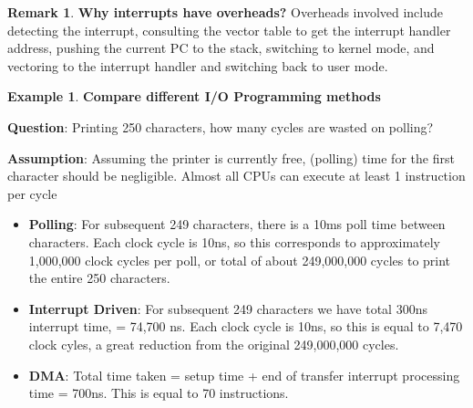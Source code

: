 \documentclass[11pt,a4paper]{article}
\theoremstyle{definition}
\newtheorem*{remark}{Remark}
\newtheorem{example}{Example}[section]
\newenvironment{myitemize}
{ \begin{itemize}
    \setlength{\itemsep}{5pt}
    \setlength{\parskip}{0pt}
    \setlength{\parsep}{0pt}     }
{ \end{itemize}                  }
\begin{document}
\begin{remark}{\textbf{Why interrupts have overheads?}}
	Overheads involved include detecting the interrupt, consulting the vector table to get the interrupt handler address, pushing the current PC to the stack, switching to kernel mode, and vectoring to the interrupt handler and switching back to user mode.
\end{remark}

\begin{example}{\textbf{Compare different I/O Programming methods}}

	\textbf{Question}: Printing 250 characters, how many cycles are wasted on polling?
	
	\textbf{Assumption}: Assuming the printer is currently free, (polling) time for the first character should be negligible. Almost all CPUs can execute at least 1 instruction per cycle
	
	\begin{myitemize}
		\item \textbf{Polling}: For subsequent 249 characters, there is a 10ms poll time between characters. Each clock cycle is 10ns, so this corresponds to approximately 1,000,000 clock cycles per poll, or total of about 249,000,000 cycles to print the entire 250 characters.
		\item \textbf{Interrupt Driven}: For subsequent 249 characters we have total 300ns interrupt time, = 74,700 ns. Each clock cycle is 10ns, so this is equal to 7,470 clock cyles, a great reduction from the original 249,000,000 cycles.
		\item \textbf{DMA}: Total time taken = setup time + end of transfer interrupt processing time = 700ns. This is equal to 70 instructions.
	\end{myitemize}
\end{example}



\end{document}

